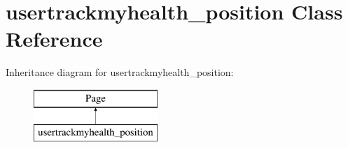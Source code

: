 \hypertarget{classusertrackmyhealth__position}{\section{usertrackmyhealth\-\_\-position Class Reference}
\label{classusertrackmyhealth__position}
}
Inheritance diagram for usertrackmyhealth\-\_\-position\-:\begin{figure}[H]
\begin{center}
\leavevmode
\includegraphics[height=2.000000cm]{classusertrackmyhealth__position}
\end{center}
\end{figure}
